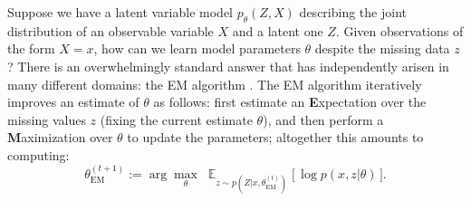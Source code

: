 \documentclass[twoside]{article}
\theoremstyle{plain}
\theoremstyle{definition}
\theoremstyle{remark}
\DeclareMathOperator*{\Ex}{\mathbb{E}} %
\begin{document}
Suppose we have a latent variable model $p_\theta(Z,X)$
describing the joint distribution of an observable variable $X$ and a latent one $Z$.
%
Given observations of the form $X{=}x$,
how can we learn model parameters $\theta$ despite the missing data $z$?
There is an overwhelmingly standard answer that has independently arisen in many different domains:
the EM algorithm \citep{dempster1977maximum,mclachlan2008algorithm}.
The EM algorithm iteratively improves an estimate of $\theta$ as follows: first estimate an 
\textbf Expectation over the missing values $z$ (fixing the current estimate $\theta$), and then perform a 
\textbf Maximization over $\theta$ to update the parameters;
altogether this amounts to computing:
\[
   \theta^{(t+1)}_{\text{EM}}
           := \arg\max_{\theta}\; \Ex\nolimits_{z\sim p(Z|x,\theta_{\text{EM}}^{(t)})} \big[ \,\log p(x, z | \theta) \,\big].
\]

\end{document}
